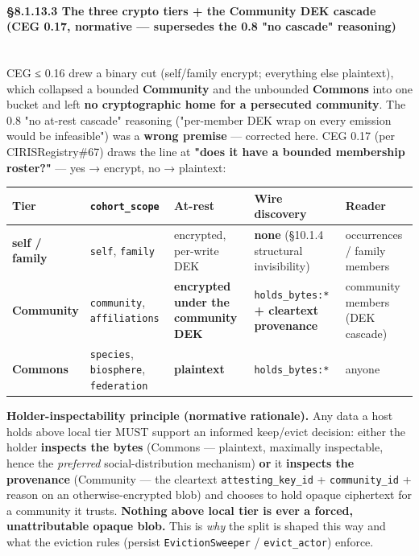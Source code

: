 \documentclass[10pt]{article}
\begin{document}
\paragraph{§8.1.13.3 The three crypto tiers + the Community DEK cascade (CEG 0.17, normative — supersedes the 0.8 "no cascade" reasoning)}\mbox{}\\


CEG ≤ 0.16 drew a binary cut (self/family encrypt; everything else plaintext), which collapsed a bounded \textbf{Community} and the unbounded \textbf{Commons} into one bucket and left \textbf{no cryptographic home for a persecuted community}. The 0.8 "no at-rest cascade" reasoning ("per-member DEK wrap on every emission would be infeasible") was a \textbf{wrong premise} — corrected here. CEG 0.17 (per CIRISRegistry\#67) draws the line at \textbf{"does it have a bounded membership roster?"} — yes → encrypt, no → plaintext:


{\scriptsize
\begin{longtable}{|p{3.2cm}|p{3.2cm}|p{3.2cm}|p{3.2cm}|p{3.2cm}|}\hline
\textbf{Tier} & \textbf{\texttt{cohort\_scope}} & \textbf{At-rest} & \textbf{Wire discovery} & \textbf{Reader} \\ \hline\endhead
\textbf{self / family} & \texttt{self}, \texttt{family} & encrypted, per-write DEK & \textbf{none} (§10.1.4 structural invisibility) & occurrences / family members \\ \hline
\textbf{Community} & \texttt{community}, \texttt{affiliations} & \textbf{encrypted under the community DEK} & \texttt{holds\_bytes:*} \textbf{+ cleartext provenance} & community members (DEK cascade) \\ \hline
\textbf{Commons} & \texttt{species}, \texttt{biosphere}, \texttt{federation} & \textbf{plaintext} & \texttt{holds\_bytes:*} & anyone \\ \hline
\end{longtable}}



\textbf{Holder-inspectability principle (normative rationale).} Any data a host holds above local tier MUST support an informed keep/evict decision: either the holder \textbf{inspects the bytes} (Commons — plaintext, maximally inspectable, hence the \textit{preferred} social-distribution mechanism) \textbf{or} it \textbf{inspects the provenance} (Community — the cleartext \texttt{attesting\_key\_id} + \texttt{community\_id} + reason on an otherwise-encrypted blob) and chooses to hold opaque ciphertext for a community it trusts. \textbf{Nothing above local tier is ever a forced, unattributable opaque blob.} This is \textit{why} the split is shaped this way and what the eviction rules (persist \texttt{EvictionSweeper} / \texttt{evict\_actor}) enforce.
\end{document}
